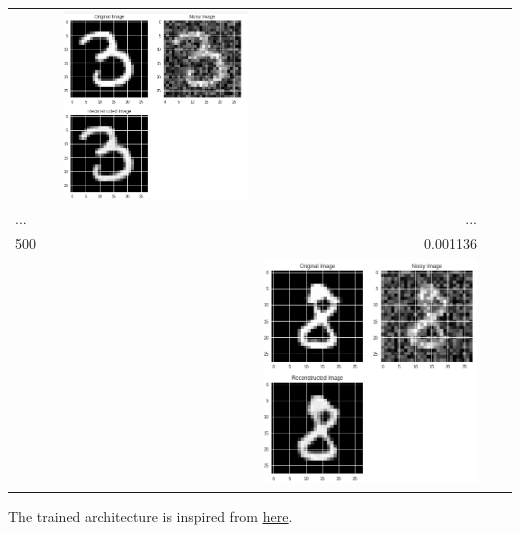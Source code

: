 \documentclass{exam}
\begin{document}
\begin{table}[h!]
\begin{center}
\begin{tabular}{l|l|l|r|r|r}
      			  &   & \includegraphics[scale=0.3]{../assets/10.png}  & \\
      			  					... &  &  & ... \\
      			  \rowcolor{yellow} 500 &  &  & 0.001136 \\
      			  &  &  & \includegraphics[scale=0.3]{../assets/11.png}\\	  						  					
    			\end{tabular}
  			\end{center}
		\end{table}
		
The trained architecture is inspired from \href{https://github.com/GunhoChoi/Kind-PyTorch-Tutorial/blob/master/07_Denoising_Autoencoder/Denoising_Autoencoder.py}{\underline{here}}.
\end{document}
